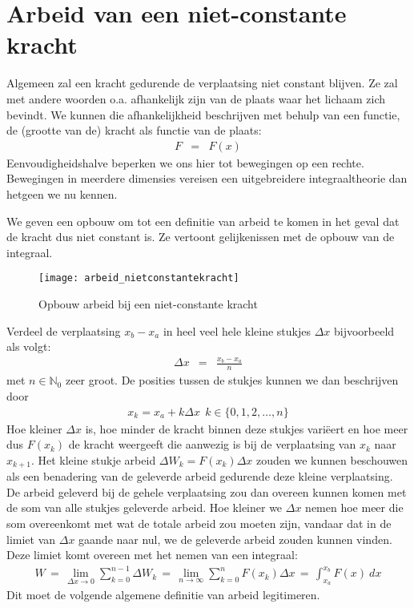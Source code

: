 \documentclass{ximera}
\begin{document}
	\author{Bart Lambregs}
    \xmsource





	\section{Arbeid van een niet-constante kracht}

	Algemeen zal een kracht gedurende de verplaatsing niet constant blijven. Ze zal met andere woorden o.a. afhankelijk zijn van de plaats waar het lichaam zich bevindt. We kunnen die afhankelijkheid beschrijven met behulp van een functie, de (grootte van de) kracht
	als functie van de plaats:
	\begin{eqnarray*}
	F&=&F(x)
	\end{eqnarray*}
	Eenvoudigheidshalve beperken we ons hier tot bewegingen op een rechte. Bewegingen in meerdere dimensies vereisen een uitgebreidere integraaltheorie dan hetgeen we nu kennen.
	
	We geven een opbouw om tot een definitie van arbeid te komen in het geval dat de kracht dus niet constant is. Ze vertoont gelijkenissen met de opbouw van de integraal.
	\begin{figure}[h]
	\centering
	\texttt{[image: arbeid\_nietconstantekracht]}
	\caption{Opbouw arbeid bij een niet-constante kracht}
	\end{figure}
	
	Verdeel de verplaatsing $x_b-x_a$ in heel veel hele kleine stukjes $\Delta x$ bijvoorbeeld als volgt:
	\begin{eqnarray*}
	\Delta x&=&\frac{x_b-x_a}{n}
	\end{eqnarray*}
	met $n\in\mathbb{N}_0$ zeer groot. De posities tussen de stukjes kunnen we dan be\-schrij\-ven door
	\begin{eqnarray*}
	x_k=x_a+k\Delta x\ \ k\in\{0,1,2,\ldots,n\}
	\end{eqnarray*}
	Hoe kleiner $\Delta x$ is, hoe minder de kracht binnen deze stukjes vari\"eert en hoe meer dus $F(x_k)$ de kracht weergeeft die aanwezig is bij de verplaatsing van $x_{k}$ naar $x_{k+1}$. Het kleine stukje arbeid $\Delta W_k=F(x_k)\Delta x$ zouden we kunnen beschouwen als
	een benadering van de geleverde arbeid gedurende deze kleine verplaatsing. De arbeid geleverd bij de gehele verplaatsing zou dan overeen kunnen komen met de som van alle stukjes geleverde arbeid. Hoe kleiner we $\Delta x$ nemen hoe meer die som overeenkomt met wat de totale arbeid zou moeten zijn, vandaar dat in de limiet van $\Delta x$ gaande naar nul, we de geleverde arbeid zouden kunnen vinden. Deze limiet komt overeen met het nemen van een integraal:
	\begin{eqnarray*}
	W\,=\,\lim_{\Delta x\rightarrow0}\sum_{k=0}^{n-1}\Delta W_k
	\,=\,\lim_{n\rightarrow\infty}\sum_{k=0}^{n}F(x_k)\Delta x
	\,=\,\int_{x_a}^{x_b}F(x)~dx
	\end{eqnarray*}
	Dit moet de volgende algemene definitie van arbeid legitimeren.
	
\end{document}
